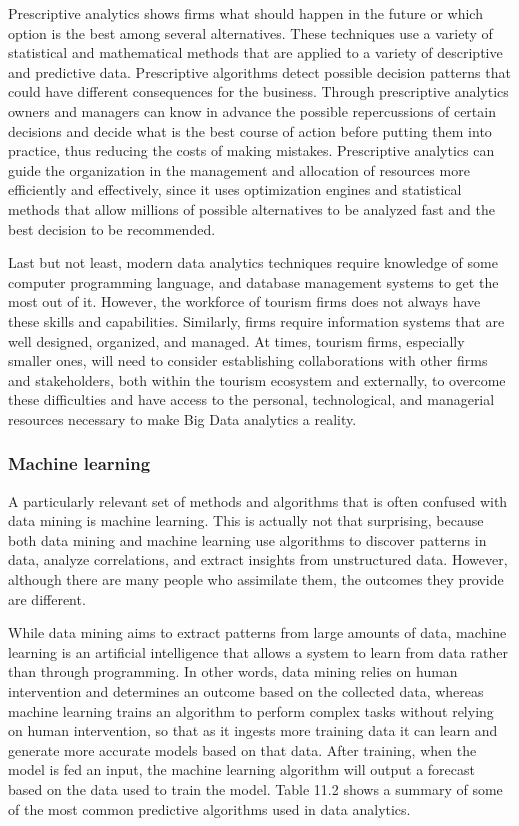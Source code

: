 \documentclass[
  letterpaper,
  DIV=11,
  numbers=noendperiod]{scrreprt}
\begin{document}
Prescriptive analytics shows firms what should happen in the future or
which option is the best among several alternatives. These techniques
use a variety of statistical and mathematical methods that are applied
to a variety of descriptive and predictive data. Prescriptive algorithms
detect possible decision patterns that could have different consequences
for the business. Through prescriptive analytics owners and managers can
know in advance the possible repercussions of certain decisions and
decide what is the best course of action before putting them into
practice, thus reducing the costs of making mistakes. Prescriptive
analytics can guide the organization in the management and allocation of
resources more efficiently and effectively, since it uses optimization
engines and statistical methods that allow millions of possible
alternatives to be analyzed fast and the best decision to be
recommended.

Last but not least, modern data analytics techniques require knowledge
of some computer programming language, and database management systems
to get the most out of it. However, the workforce of tourism firms does
not always have these skills and capabilities. Similarly, firms require
information systems that are well designed, organized, and managed. At
times, tourism firms, especially smaller ones, will need to consider
establishing collaborations with other firms and stakeholders, both
within the tourism ecosystem and externally, to overcome these
difficulties and have access to the personal, technological, and
managerial resources necessary to make Big Data analytics a reality.

\hypertarget{machine-learning-1}{%
\subsubsection{Machine learning}\label{machine-learning-1}}

A particularly relevant set of methods and algorithms that is often
confused with data mining is machine learning. This is actually not that
surprising, because both data mining and machine learning use algorithms
to discover patterns in data, analyze correlations, and extract insights
from unstructured data. However, although there are many people who
assimilate them, the outcomes they provide are different.

While data mining aims to extract patterns from large amounts of data,
machine learning is an artificial intelligence that allows a system to
learn from data rather than through programming. In other words, data
mining relies on human intervention and determines an outcome based on
the collected data, whereas machine learning trains an algorithm to
perform complex tasks without relying on human intervention, so that as
it ingests more training data it can learn and generate more accurate
models based on that data. After training, when the model is fed an
input, the machine learning algorithm will output a forecast based on
the data used to train the model. Table 11.2 shows a summary of some of
the most common predictive algorithms used in data analytics.
\end{document}
